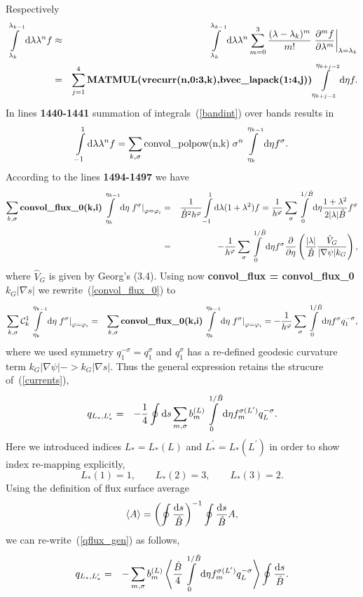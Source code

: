 \documentclass[preprint,prb,aps]{revtex4-1}
\newcommand{\be}[1]{\begin{equation} \label{#1}}
\newcommand{\ee}{\end{equation}}
\newcommand{\bea}[1]{\begin{eqnarray} \label{#1}}
\newcommand{\eea}{\end{eqnarray}}
\newcommand{\eq}[1]{(\ref{#1})}
\newcommand{\difp}[2]{\frac{\partial #1}{\partial #2}}
\newcommand{\rd}{{\rm d}}
\begin{document}
Respectively
\bea{bandint}
\int\limits_{\lambda_k}^{\lambda_{k-1}}\rd\lambda \lambda^n f
&\approx &
\int\limits_{\lambda_k}^{\lambda_{k-1}}\rd\lambda \lambda^n \sum\limits_{m=0}^3 \frac{(\lambda-\lambda_k)^m}{m!}
\left.\difp{^m f}{\lambda^m}\right|_{\lambda=\lambda_k}
\\
&=&
\sum\limits_{j=1}^4 \mbox{\bf MATMUL(vrecurr(n,0:3,k),bvec\_lapack(1:4,j))}
\int\limits_{\eta_{k+j-3}}^{\eta_{k+j-2}}\rd \eta f.
\nonumber
\eea
In lines {\bf 1440-1441} summation of integrals~\eq{bandint} over bands results in
$$
\int\limits_{-1}^{1}\rd\lambda \lambda^n f
=
\sum_{k,\sigma} \mbox{\rm convol\_polpow(n,k)}\; \sigma^n \int\limits_{\eta_{k}}^{\eta_{k-1}}\rd \eta f^\sigma.
$$
According to the lines {\bf 1494-1497} we have
\bea{convol_flux_0}
\sum_{k,\sigma} \mbox{\bf convol\_flux\_0(k,i)} \int\limits_{\eta_{k}}^{\eta_{k-1}}\rd \eta
\left. f^\sigma\right|_{\varphi=\varphi_i}
&=&
\frac{1}{\hat B^2 h^\varphi} \int\limits_{-1}^{1}\rd\lambda (1+\lambda^2) f
=
\frac{1}{h^\varphi}\sum_\sigma \int\limits_0^{1/\hat B}\rd \eta\frac{1+\lambda^2}{2|\lambda|\hat B} f^\sigma
\nonumber \\
&=&
-\frac{1}{h^\varphi} \sum_\sigma \int\limits_0^{1/\hat B}\rd \eta f^\sigma \difp{}{\eta}
\left(\frac{|\lambda|}{\hat B}\frac{\hat V_G}{|\nabla\psi|k_G}\right),
\nonumber
\eea
where $\hat V_G$ is given by Georg's (3.4).
Using now {\bf convol\_flux = convol\_flux\_0} $k_G |\nabla s|$ we rewrite~\eq{convol_flux_0} to
\bea{convol_flux_0_rewr}
\sum_{k,\sigma} {\cal C}_k^1 \int\limits_{\eta_{k}}^{\eta_{k-1}}\rd \eta \left. f^\sigma\right|_{\varphi=\varphi_i}
&=&
\sum_{k,\sigma} \mbox{\bf convol\_flux\_0(k,i)} \int\limits_{\eta_{k}}^{\eta_{k-1}}\rd \eta
\left. f^\sigma\right|_{\varphi=\varphi_i}
=
-\frac{1}{h^\varphi} \sum_\sigma \int\limits_0^{1/\hat B}\rd \eta f^\sigma q_1^{-\sigma},
\eea
where we used symmetry $q_1^{-\sigma}=q_1^{\sigma}$ and $q_1^\sigma$ has a re-defined geodesic curvature term
$k_G |\nabla \psi| -> k_G |\nabla s|$. Thus the general expression retains the strucure of~\eq{currents},
\bea{qflux_gen}
q_{L_\ast,L_\ast^\prime}
&=& -\frac{1}{4} \oint \rd s \sum_{m,\sigma} b^{(L)}_m
\int\limits_{0}^{1/\hat B}\rd \eta f^{\sigma(L^\prime)}_m q_L^{-\sigma}.
\eea
Here we introduced indices $L_\ast=L_\ast(L)$ and $L_\ast^\prime=L_\ast(L^\prime)$
in order to show index re-mapping explicitly,
\be{indremap}
L_\ast(1)=1, \qquad L_\ast(2)=3, \qquad L_\ast(3)=2.
\ee
Using the definition of flux surface average
$$
\langle A \rangle = \left(\oint \frac{\rd s}{\hat B}\right)^{-1} \oint \frac{\rd s}{\hat B} A,
$$
we can re-write~\eq{qflux_gen} as follows,
\bea{qflux_gen_flaver}
q_{L_\ast,L_\ast^\prime}
&=& - \sum_{m,\sigma} b^{(L)}_m
\left\langle \frac{\hat B}{4}\int\limits_{0}^{1/\hat B}\rd \eta f^{\sigma(L^\prime)}_m q_L^{-\sigma}\right\rangle
\oint \frac{\rd s}{\hat B}.
\eea
\end{document}
